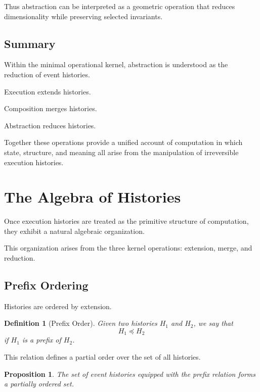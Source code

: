 \documentclass[12pt]{article}
\newtheorem{definition}{Definition}
\newtheorem{proposition}{Proposition}
\begin{document}
Thus abstraction can be interpreted as a geometric
operation that reduces dimensionality while preserving
selected invariants.

\subsection{Summary}

Within the minimal operational kernel, abstraction
is understood as the reduction of event histories.

Execution extends histories.

Composition merges histories.

Abstraction reduces histories.

Together these operations provide a unified account
of computation in which state, structure, and meaning
all arise from the manipulation of irreversible
execution histories.


\section{The Algebra of Histories}

Once execution histories are treated as the primitive
structure of computation, they exhibit a natural algebraic
organization.

This organization arises from the three kernel operations:
extension, merge, and reduction.

\subsection{Prefix Ordering}

Histories are ordered by extension.

\begin{definition}[Prefix Order]
Given two histories $H_1$ and $H_2$, we say that
\[
H_1 \preceq H_2
\]
if $H_1$ is a prefix of $H_2$.
\end{definition}

This relation defines a partial order over the set
of all histories.

\begin{proposition}
The set of event histories equipped with the prefix
relation forms a partially ordered set.
\end{proposition}
\end{document}
